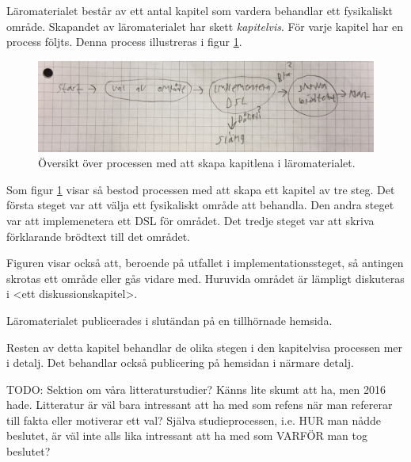 \begin{draft}

Läromaterialet består av ett antal kapitel som vardera behandlar ett fysikaliskt område. Skapandet av läromaterialet har skett \textit{kapitelvis}. För varje kapitel har en process följts. Denna process illustreras i figur \ref{fig:hejhejhej}.

  \begin{figure}[h]
    \includegraphics[width=\linewidth]{figure/hejhejhej.jpg}
    \caption{Översikt över processen med att skapa kapitlena i läromaterialet.}
    \label{fig:hejhejhej}
  \end{figure}

Som figur \ref{fig:hejhejhej} visar så bestod processen med att skapa ett kapitel av tre steg. Det första steget var att välja ett fysikaliskt område att behandla. Den andra steget var att implemenetera ett DSL för området. Det tredje steget var att skriva förklarande brödtext till det området.

Figuren visar också att, beroende på utfallet i implementationssteget, så antingen skrotas ett område eller gås vidare med. Huruvida området är lämpligt diskuteras i <ett diskussionskapitel>.

Läromaterialet publicerades i slutändan på en tillhörnade hemsida.

Resten av detta kapitel behandlar de olika stegen i den kapitelvisa processen mer i detalj. Det behandlar också publicering på hemsidan i närmare detalj.


\end{draft}

TODO: Sektion om våra litteraturstudier? Känns lite skumt att ha,
men 2016 hade. Litteratur är väl bara intressant att ha med som
refens när man refererar till fakta eller motiverar ett val? Själva
studieprocessen, i.e. HUR man nådde beslutet, är väl inte alls lika
intressant att ha med som VARFÖR man tog beslutet?

